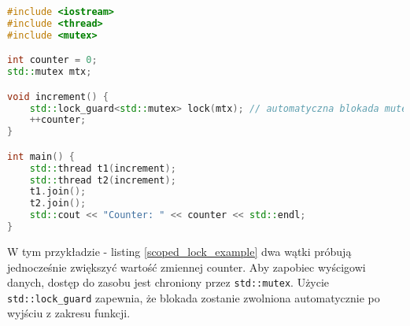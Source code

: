 \begin{lstlisting}[language=C++, caption={Przykład użycia std::scoped\_lock}, label={scoped_lock_example}]
#include <iostream>
#include <thread>
#include <mutex>

int counter = 0;
std::mutex mtx;

void increment() {
    std::lock_guard<std::mutex> lock(mtx); // automatyczna blokada mutexu
    ++counter;
}

int main() {
    std::thread t1(increment);
    std::thread t2(increment);
    t1.join();
    t2.join();
    std::cout << "Counter: " << counter << std::endl;
}
\end{lstlisting}
W tym przykładzie - listing \ref{scoped_lock_example} dwa wątki próbują jednocześnie zwiększyć wartość zmiennej counter. Aby zapobiec wyścigowi danych, dostęp do zasobu jest chroniony przez \texttt{std::mutex}. Użycie \texttt{std::lock\_guard} zapewnia, że blokada zostanie zwolniona automatycznie po wyjściu z zakresu funkcji.

